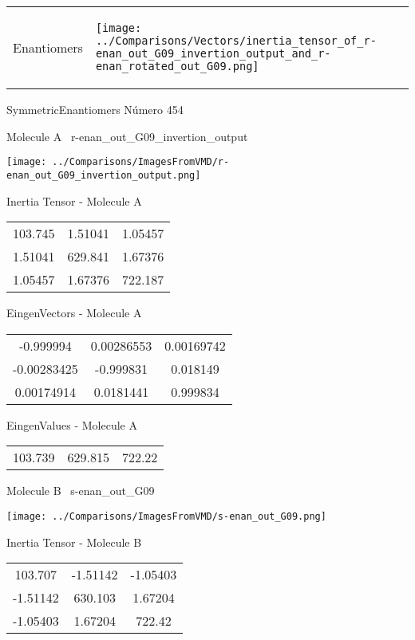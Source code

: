 \vtab[-5mm]
\begin{tabular}{*{2}{m{}}}
\begin{center}
\textcolor{NavyBlue}{\Large Enantiomers}
\end{center}
&
\begin{center}
\texttt{[image: ../Comparisons/Vectors/inertia\_tensor\_of\_r-enan\_out\_G09\_invertion\_output\_and\_r-enan\_rotated\_out\_G09.png]}
\end{center}
\end{tabular}

 \newpage

\vtab[-3cm]
\begin{center}
{\large SymmetricEnantiomers \tab Número 454}
\end{center}
\begin{multicols}{2}
\begin{center}

Molecule A \
r-enan\_out\_G09\_invertion\_output

\texttt{[image: ../Comparisons/ImagesFromVMD/r-enan\_out\_G09\_invertion\_output.png]}

Inertia Tensor - Molecule A \\
\begin{tabular}{|c c c|}
103.745	 & 	1.51041	 & 	1.05457	 \\
1.51041	 & 	629.841	 & 	1.67376	 \\
1.05457	 & 	1.67376	 & 	722.187
\end{tabular}

\vtab
 EingenVectors - Molecule A     \\
\begin{tabular}{|c c c|}
-0.999994	 & 	0.00286553	 & 	0.00169742	 \\
-0.00283425	 & 	-0.999831	 & 	0.018149	 \\
0.00174914	 & 	0.0181441	 & 	0.999834
\end{tabular}

\vtab
 EingenValues - Molecule A     \\
\begin{tabular}{|c c c|}
103.739	 & 	629.815	 & 	722.22	 \\
\end{tabular}
\columnbreak

Molecule B \
s-enan\_out\_G09

\texttt{[image: ../Comparisons/ImagesFromVMD/s-enan\_out\_G09.png]}

Inertia Tensor - Molecule B \\
\begin{tabular}{|c c c|}
103.707	 & 	-1.51142	 & 	-1.05403	 \\
-1.51142	 & 	630.103	 & 	1.67204	 \\
-1.05403	 & 	1.67204	 & 	722.42
\end{tabular}


\end{center}
\end{multicols}
